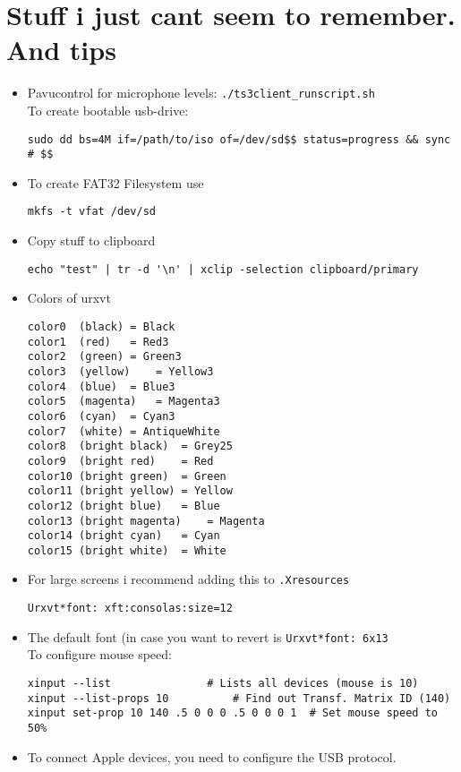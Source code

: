 \documentclass{article}
\begin{document}
\section{Stuff i just cant seem to remember. And tips}
\begin{itemize}
\item 
Pavucontrol for microphone levels: \verb`./ts3client_runscript.sh` \\
To create bootable usb-drive:
\begin{lstlisting}
sudo dd bs=4M if=/path/to/iso of=/dev/sd$$ status=progress && sync # $$
\end{lstlisting}
\item
To create FAT32 Filesystem use
\begin{lstlisting}
mkfs -t vfat /dev/sd
\end{lstlisting}
\item
Copy stuff to clipboard
\begin{lstlisting}
echo "test" | tr -d '\n' | xclip -selection clipboard/primary
\end{lstlisting}
\item
Colors of urxvt
\begin{lstlisting}
color0	(black)	= Black
color1	(red)	= Red3
color2	(green)	= Green3
color3	(yellow)    = Yellow3
color4	(blue)	= Blue3
color5	(magenta)   = Magenta3
color6	(cyan)	= Cyan3
color7	(white)	= AntiqueWhite
color8	(bright black)	= Grey25
color9	(bright red)	= Red
color10	(bright green)	= Green
color11	(bright yellow)	= Yellow
color12	(bright blue)	= Blue
color13	(bright magenta)    = Magenta
color14	(bright cyan)	= Cyan
color15	(bright white)	= White
\end{lstlisting}
\item
For large screens i recommend adding this to \verb`.Xresources`
\begin{lstlisting}
Urxvt*font: xft:consolas:size=12
\end{lstlisting}
\item
The default font (in case you want to revert is \verb`Urxvt*font: 6x13` \\
To configure mouse speed:
\begin{lstlisting}
xinput --list			    # Lists all devices (mouse is 10)
xinput --list-props 10		    # Find out Transf. Matrix ID (140)
xinput set-prop 10 140 .5 0 0 0 .5 0 0 0 1  # Set mouse speed to 50%
\end{lstlisting}
\item
To connect Apple devices, you need to configure the USB protocol. \\

\end{itemize}
\end{document}
